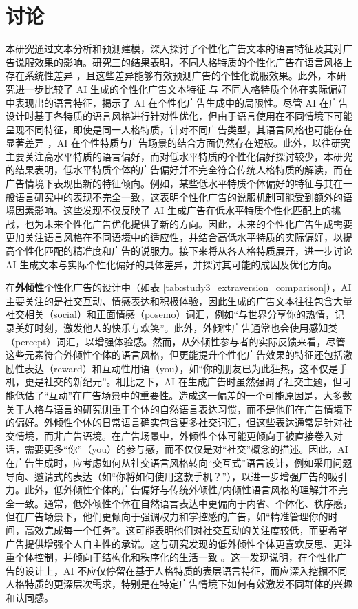 \section{讨论} 

本研究通过文本分析和预测建模，深入探讨了个性化广告文本的语言特征及其对广告说服效果的影响。研究三的结果表明，不同人格特质的个性化广告在语言风格上存在系统性差异 \citep{koutsoumpis2022kernel}，且这些差异能够有效预测广告的个性化说服效果。此外，本研究进一步比较了 AI 生成的个性化广告文本特征 与 不同人格特质个体在实际偏好中表现出的语言特征，揭示了 AI 在个性化广告生成中的局限性。尽管 AI 在广告设计时基于各特质的语言风格进行针对性优化，但由于语言使用在不同情境下可能呈现不同特征，即使是同一人格特质，针对不同广告类型，其语言风格也可能存在显著差异 \citep{flores2014effect}，AI 在个性特质与广告场景的结合方面仍然存在短板。此外，以往研究主要关注高水平特质的语言偏好，而对低水平特质的个性化偏好探讨较少，本研究的结果表明，低水平特质个体的广告偏好并不完全符合传统人格特质的解读，而在广告情境下表现出新的特征倾向。例如，某些低水平特质个体偏好的特征与其在一般语言研究中的表现不完全一致，这表明个性化广告的说服机制可能受到额外的语境因素影响。这些发现不仅反映了 AI 生成广告在低水平特质个性化匹配上的挑战，也为未来个性化广告优化提供了新的方向。因此，未来的个性化广告生成需要更加关注语言风格在不同语境中的适应性，并结合高低水平特质的实际偏好，以提高个性化匹配的精准度和广告的说服力。接下来将从各人格特质展开，进一步讨论 AI 生成文本与实际个性化偏好的具体差异，并探讨其可能的成因及优化方向。

在\textbf{外倾性}个性化广告的设计中（如表 \ref{tab:study3_extraversion_comparison}），AI 主要关注的是社交互动、情感表达和积极体验，因此生成的广告文本往往包含大量社交相关（social）和正面情感（posemo）词汇，例如“与世界分享你的热情，记录美好时刻，激发他人的快乐与欢笑”。此外，外倾性广告通常也会使用感知类（percept）词汇，以增强体验感。然而，从外倾性参与者的实际反馈来看，尽管这些元素符合外倾性个体的语言风格，但更能提升个性化广告效果的特征还包括激励性表达（reward）和互动性用语（you），如“你的朋友已为此狂热，这不仅是手机，更是社交的新纪元”。相比之下，AI 在生成广告时虽然强调了社交主题，但可能低估了“互动”在广告场景中的重要性。造成这一偏差的一个可能原因是，大多数关于人格与语言的研究侧重于个体的自然语言表达习惯，而不是他们在广告情境下的偏好。外倾性个体的日常语言确实包含更多社交词汇，但这些表达通常是针对社交情境，而非广告语境。在广告场景中，外倾性个体可能更倾向于被直接卷入对话，需要更多“你”（you）的参与感，而不仅仅是对“社交”概念的描述。因此，AI 在广告生成时，应考虑如何从社交语言风格转向“交互式”语言设计，例如采用问题导向、邀请式的表达（如“你将如何使用这款手机？”），以进一步增强广告的吸引力。此外，低外倾性个体的广告偏好与传统外倾性/内倾性语言风格的理解并不完全一致。通常，低外倾性个体在自然语言表达中更偏向于内省、个体化、秩序感，但在广告场景下，他们更倾向于强调权力和掌控感的广告，如“精准管理你的时间，高效完成每一个任务”。这可能表明他们对社交互动的关注度较低，而更希望广告提供增强个人自主性的承诺。这与研究发现的低外倾性个体更喜欢反思、更注重个体控制，并倾向于结构化和秩序化的生活一致 \citep{beukeboom2013language}。这一发现说明，在个性化广告的设计上，AI 不应仅停留在基于人格特质的表层语言特征，而应深入挖掘不同人格特质的更深层次需求，特别是在特定广告情境下如何有效激发不同群体的兴趣和认同感。



